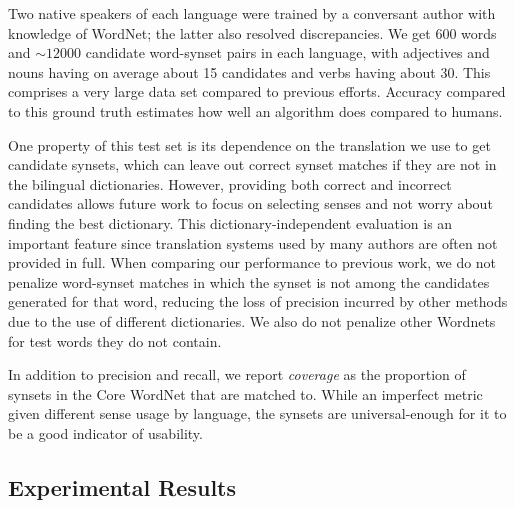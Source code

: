 \documentclass{book}
\begin{document}
Two native speakers of each language were trained by a conversant author with knowledge of WordNet;
the latter also resolved discrepancies.
We get 600 words and $\sim 12000$ candidate word-synset pairs in each language, with adjectives and nouns having on average about 15 candidates and verbs having about 30.
This comprises a very large data set compared to previous efforts.
Accuracy compared to this ground truth estimates how well an algorithm does compared to humans.

One property of this test set is its dependence on the translation we use to get candidate synsets, which can leave out correct synset matches if they are not in the bilingual dictionaries.
However, providing both correct and incorrect candidates allows future work to focus on selecting senses and not worry about finding the best dictionary.
This dictionary-independent evaluation is an important feature since translation systems used by many authors are often not provided in full.
When comparing our performance to previous work, we do not penalize word-synset matches in which the synset is not among the candidates generated for that word, reducing the loss of precision incurred by other methods due to the use of different dictionaries. 
We also do not penalize other Wordnets for test words they do not contain.

In addition to precision and recall, we report {\em coverage} as the proportion of synsets in the Core WordNet that are matched to.
While an imperfect metric given different sense usage by language, the synsets are universal-enough for it to be a good indicator of usability.

\subsection{Experimental Results}
\label{subsec:results}
\end{document}
